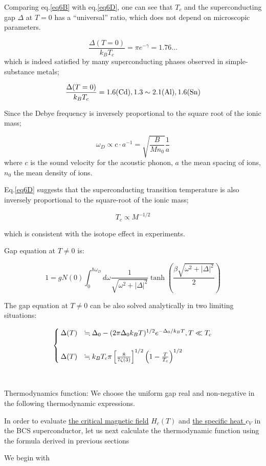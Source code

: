 Comparing eq.\eqref{eq6B} with eq.\eqref{eq6D}, one can see that $T_c$ and the superconducting gap $\Delta$ at $T=0$ has a ``universal'' ratio, which does not depend on microscopic parameters. 

\[\frac{\Delta(T=0)}{k_BT_c} = \pi e^{-\gamma} = 1.76... \]
which is indeed satisfied by many superconducting phases observed in simple-substance metals; 

\[\frac{\Delta(T=0)}{k_BT_c} = 1.6(\ce{Cd}), 1.3\sim2.1(\ce{Al}), 1.6(\ce{Sn}) \]

Since the Debye frequency is inversely proportional to the square root of the ionic mass;

\[\omega_D\propto c\cdot a^{-1} = \sqrt{\frac{B}{Mn_0}}\frac{1}{a} \]
where $c$ is the sound velocity for the acoustic phonon, $a$ the mean spacing of ions, $n_0$ the mean density of ions. 

Eq.\eqref{eq6D} suggests that the superconducting transition temperature is also inversely proportional to the square-root of the ionic mass; 

\[T_c\propto M^{-1/2} \]

which is consistent with the isotope effect in experiments. 

Gap equation at $T\neq 0$ is:

\[1=gN(0)\int_0^{\hbar\omega_D}d\omega\frac{1}{\sqrt{\omega^2+|\Delta|^2}}\tanh\left(\frac{\beta\sqrt{\omega^2+|\Delta|^2}}{2}\right) \]

The gap equation at $T\neq0$ can be also solved analytically in two limiting situations:

\[\begin{cases}
\Delta(T)&\fallingdotseq \Delta_0 - (2\pi\Delta_0k_BT)^{1/2}e^{-\Delta_0/k_BT}, T\ll T_c\\
&\\
\Delta(T)&\fallingdotseq k_BT_c\pi\left[\frac{8}{7\zeta(3)}\right]^{1/2}\left(1-\frac{T}{T_c}\right)^{1/2}
\end{cases}\]

\dotfill

\ 

Thermodynamics function: We choose the uniform gap real and non-negative in the following thermodynamic expressions.

In order to evaluate \uline{the critical magnetic field} $H_c(T)$ and \uline{the specific heat $c_V$} in the BCS superconductor, let us next calculate the thermodynamic function using the formula derived in previous sections %

We begin with

